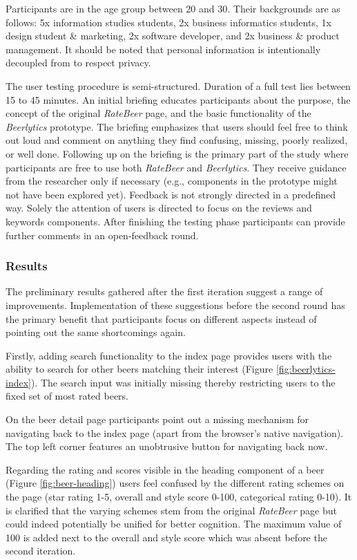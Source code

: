 Participants are in the age group between 20 and 30.
Their backgrounds are as follows: 5x information studies students, 2x business informatics students, 1x design student \& marketing, 2x software developer, and 2x business \& product management.
It should be noted that personal information is intentionally decoupled from  to respect privacy.

The user testing procedure is semi-structured.
Duration of a full test lies between 15 to 45 minutes.
An initial briefing educates participants about the purpose, the concept of the original \textit{RateBeer} page, and the basic functionality of the \textit{Beerlytics} prototype.
The briefing emphasizes that users should feel free to think out loud and comment on anything they find confusing, missing, poorly realized, or well done. 
Following up on the briefing is the primary part of the study where participants are free to use both \textit{RateBeer} and \textit{Beerlytics}.
They receive guidance from the researcher only if necessary (e.g., components in the prototype might not have been explored yet).
Feedback is not strongly directed in a predefined way.
Solely the attention of users is directed to focus on the reviews and keywords components.
After finishing the testing phase participants can provide further comments in an open-feedback round.


\subsubsection{Results} \label{sec:results}
The preliminary results gathered after the first iteration suggest a range of improvements.
Implementation of these suggestions before the second round has the primary benefit that participants focus on different aspects instead of pointing out the same shortcomings again.

Firstly, adding search functionality to the index page provides users with the ability to search for other beers matching their interest (Figure \ref{fig:beerlytics-index}).
The search input was initially missing thereby restricting users to the fixed set of most rated beers.

On the beer detail page participants point out a missing mechanism for navigating back to the index page (apart from the browser's native navigation).
The top left corner features an unobtrusive button for navigating back now.

Regarding the rating and scores visible in the heading component of a beer (Figure \ref{fig:beer-heading}) users feel confused by the different rating schemes on the page (star rating 1-5, overall and style score 0-100, categorical rating 0-10).
It is clarified that the varying schemes stem from the original \textit{RateBeer} page but could indeed potentially be unified for better cognition.
The maximum value of 100 is added next to the overall and style score which was absent before the second iteration.

